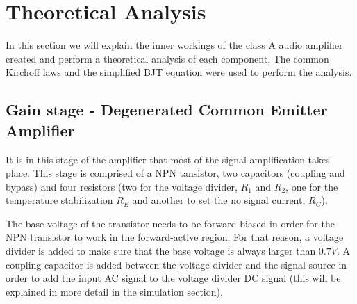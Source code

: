 
\section{Theoretical Analysis}
\label{sec:analysis}



In this section we will explain the inner workings of the class A audio amplifier created and perform a theoretical analysis of each component. 
The common Kirchoff laws and the simplified BJT equation were used to perform the analysis.


\subsection{Gain stage - Degenerated Common Emitter Amplifier}
\label{subsec:transf}



It is in this stage of the amplifier that most of the signal amplification takes place. This stage is comprised of a NPN tansistor, two capacitors (coupling and bypass) and four resistors (two for the voltage divider, $R_1$ and $R_2$, one for the temperature stabilization $R_E$ and another to set the no signal current, $R_C$).

The base voltage of the transistor needs to be forward biased in order for the NPN transistor to work in the forward-active region. For that reason, a voltage divider is added to make sure that the base voltage is always larger than $0.7V$. A coupling capacitor is added between the voltage divider and the signal source in order to add the input AC signal to the voltage divider DC signal (this will be explained in more detail in the simulation section).

